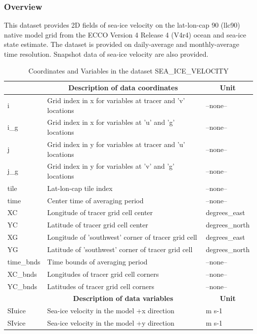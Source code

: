 \subsubsection{Overview}
This dataset provides 2D fields of sea-ice velocity on the lat-lon-cap 90 (llc90) native model grid from the ECCO Version 4 Release 4 (V4r4) ocean and sea-ice state estimate. The dataset is provided on daily-average and monthly-average time resolution. Snapshot data of sea-ice velocity are also provided. 
\begin{longtable}{|m{}|m{}|m{}|}
\caption{Coordinates and Variables in the dataset SEA\_ICE\_VELOCITY}
\label{tab:table-SEA_ICE_VELOCITY-fields} \\ 
\hline \endhead \hline \endfoot
\rowcolor{lightgray} \multicolumn{1}{|c|}{\textbf{Coordinates}} & \multicolumn{1}{|c|}{\textbf{Description of data coordinates}} &  \multicolumn{1}{|c|}{\textbf{Unit}}\\ \hline
i &Grid index in x for variables at tracer and 'v' locations &--none--  \\ \hline
i\_g &Grid index in x for variables at 'u' and 'g' locations &--none--  \\ \hline
j &Grid index in y for variables at tracer and 'u' locations &--none--  \\ \hline
j\_g &Grid index in y for variables at 'v' and 'g' locations &--none--  \\ \hline
tile &Lat-lon-cap tile index &--none--  \\ \hline
time &Center time of averaging period &--none--  \\ \hline
XC &Longitude of tracer grid cell center &degrees\_east  \\ \hline
YC &Latitude of tracer grid cell center &degrees\_north  \\ \hline
XG &Longitude of 'southwest' corner of tracer grid cell &degrees\_east  \\ \hline
YG &Latitude of 'southwest' corner of tracer grid cell &degrees\_north  \\ \hline
time\_bnds &Time bounds of averaging period &--none--  \\ \hline
XC\_bnds &Longitudes of tracer grid cell corners &--none--  \\ \hline
YC\_bnds &Latitudes of tracer grid cell corners &--none--  \\ \hline
\rowcolor{lightgray} \multicolumn{1}{|c|}{\textbf{Variables}} & \multicolumn{1}{|c|}{\textbf{Description of data variables}} &  \multicolumn{1}{|c|}{\textbf{Unit}}\\ \hline
SIuice &Sea-ice velocity in the model +x direction  &m s-1  \\ \hline
SIvice &Sea-ice velocity in the model +y direction  &m s-1  \\ \hline
\end{longtable}

